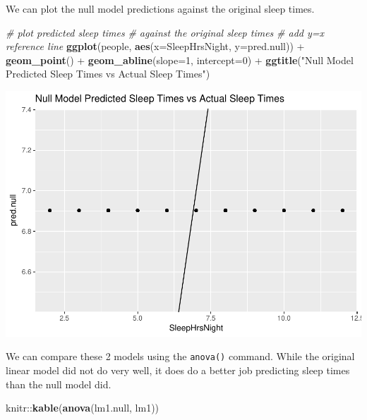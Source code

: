 \documentclass[]{article}
\newenvironment{Shaded}{\begin{snugshade}}{\end{snugshade}}
\newcommand{\KeywordTok}[1]{\textcolor[rgb]{0.13,0.29,0.53}{\textbf{{#1}}}}
\newcommand{\DataTypeTok}[1]{\textcolor[rgb]{0.13,0.29,0.53}{{#1}}}
\newcommand{\DecValTok}[1]{\textcolor[rgb]{0.00,0.00,0.81}{{#1}}}
\newcommand{\StringTok}[1]{\textcolor[rgb]{0.31,0.60,0.02}{{#1}}}
\newcommand{\CommentTok}[1]{\textcolor[rgb]{0.56,0.35,0.01}{\textit{{#1}}}}
\newcommand{\NormalTok}[1]{{#1}}
\begin{document}
We can plot the null model predictions against the original sleep times.

\begin{Shaded}
\begin{Highlighting}[]
\CommentTok{# plot predicted sleep times}
\CommentTok{# against the original sleep times}
\CommentTok{# add y=x reference line}
\KeywordTok{ggplot}\NormalTok{(people, }
       \KeywordTok{aes}\NormalTok{(}\DataTypeTok{x=}\NormalTok{SleepHrsNight, }\DataTypeTok{y=}\NormalTok{pred.null)) +}
\StringTok{  }\KeywordTok{geom_point}\NormalTok{() +}\StringTok{ }
\StringTok{  }\KeywordTok{geom_abline}\NormalTok{(}\DataTypeTok{slope=}\DecValTok{1}\NormalTok{, }\DataTypeTok{intercept=}\DecValTok{0}\NormalTok{) +}
\StringTok{  }\KeywordTok{ggtitle}\NormalTok{(}\StringTok{"Null Model Predicted Sleep Times vs Actual Sleep Times"}\NormalTok{)}
\end{Highlighting}
\end{Shaded}

\includegraphics{Hmwk7AnswerKey_files/figure-latex/unnamed-chunk-25-1.pdf}

We can compare these 2 models using the \texttt{anova()} command. While
the original linear model did not do very well, it does do a better job
predicting sleep times than the null model did.

\begin{Shaded}
\begin{Highlighting}[]
\NormalTok{knitr::}\KeywordTok{kable}\NormalTok{(}\KeywordTok{anova}\NormalTok{(lm1.null, lm1))}
\end{Highlighting}
\end{Shaded}
\end{document}
